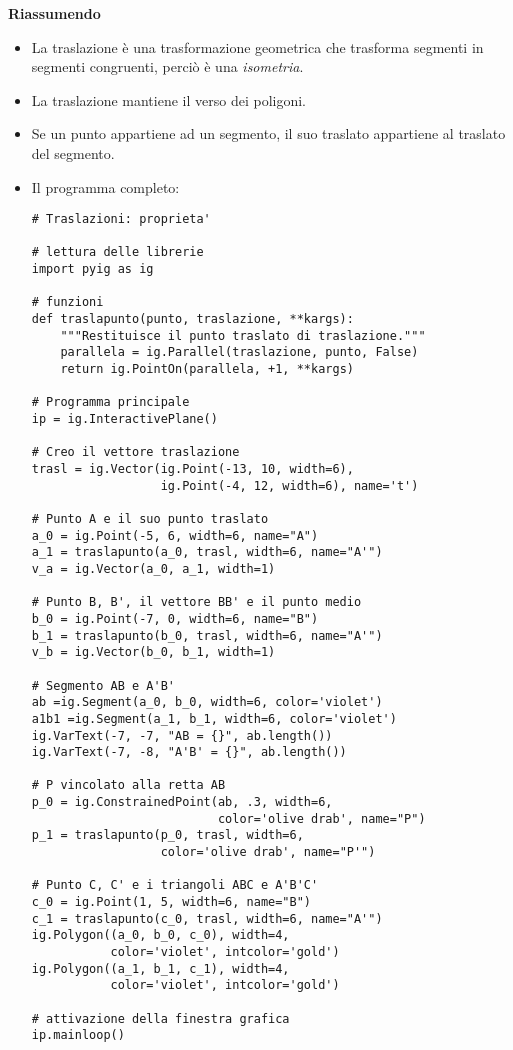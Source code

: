 \textbf{Riassumendo}
\begin{itemize} [noitemsep]
\item La traslazione è una trasformazione geometrica che trasforma segmenti
in segmenti congruenti, perciò è una \emph{isometria}.
\item La traslazione mantiene il verso dei poligoni.
\item Se un punto appartiene ad un segmento, il suo traslato appartiene al
traslato del segmento.
\item Il programma completo:

\begin{lstlisting}
# Traslazioni: proprieta'

# lettura delle librerie
import pyig as ig

# funzioni
def traslapunto(punto, traslazione, **kargs):
    """Restituisce il punto traslato di traslazione."""
    parallela = ig.Parallel(traslazione, punto, False)
    return ig.PointOn(parallela, +1, **kargs)

# Programma principale
ip = ig.InteractivePlane()

# Creo il vettore traslazione
trasl = ig.Vector(ig.Point(-13, 10, width=6),
                  ig.Point(-4, 12, width=6), name='t')

# Punto A e il suo punto traslato
a_0 = ig.Point(-5, 6, width=6, name="A")
a_1 = traslapunto(a_0, trasl, width=6, name="A'")
v_a = ig.Vector(a_0, a_1, width=1)

# Punto B, B', il vettore BB' e il punto medio
b_0 = ig.Point(-7, 0, width=6, name="B")
b_1 = traslapunto(b_0, trasl, width=6, name="A'")
v_b = ig.Vector(b_0, b_1, width=1)

# Segmento AB e A'B'
ab =ig.Segment(a_0, b_0, width=6, color='violet')
a1b1 =ig.Segment(a_1, b_1, width=6, color='violet')
ig.VarText(-7, -7, "AB = {}", ab.length())
ig.VarText(-7, -8, "A'B' = {}", ab.length())

# P vincolato alla retta AB
p_0 = ig.ConstrainedPoint(ab, .3, width=6, 
                          color='olive drab', name="P")
p_1 = traslapunto(p_0, trasl, width=6, 
                  color='olive drab', name="P'")

# Punto C, C' e i triangoli ABC e A'B'C'
c_0 = ig.Point(1, 5, width=6, name="B")
c_1 = traslapunto(c_0, trasl, width=6, name="A'")
ig.Polygon((a_0, b_0, c_0), width=4, 
           color='violet', intcolor='gold')
ig.Polygon((a_1, b_1, c_1), width=4, 
           color='violet', intcolor='gold')

# attivazione della finestra grafica
ip.mainloop()
\end{lstlisting}

\end{itemize}


